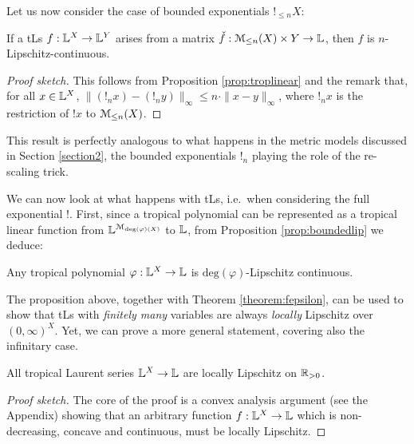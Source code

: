 Let us now consider the case of bounded exponentials $!_{\leq n}X$:
\begin{proposition}\label{prop:boundedlip}
If a tLs $f: \mathbb{L}^{X}\to \mathbb{L}^{Y}$ arises from a matrix $\check f:{\mathcal{M}_{\leq n}(X)}\times Y\to \mathbb{L}$, then $f$ is $n$-Lipschitz-continuous.
\end{proposition}
\begin{proof}[Proof sketch]
This follows from Proposition \ref{prop:troplinear} and the remark that, for all $x\in \mathbb{L}^{X}$, $\| (!_{n} x)-(!_{n} y)\|_{\infty}\leq n\cdot \| x- y\|_{\infty}$, where $!_{n} x$ is the restriction of $! x$ to $\mathcal{M}_{\leq n}(X)$.%
\end{proof}
This result is perfectly analogous to what happens in the metric models discussed in Section \ref{section2}, the bounded exponentials $!_{n}$ playing the role of the re-scaling trick.

We can now look at what happens with tLs, i.e.~when considering the full exponential $!$.
First, since a tropical polynomial can be represented as a tropical linear function from $\mathbb{L}^{\mathcal{M}_{\mathrm{deg}(\varphi)(X)}}$ to $\mathbb{L}$, from Proposition \ref{prop:boundedlip} we deduce:
\begin{proposition}\label{prop:polylip}
Any tropical polynomial $\varphi:\mathbb{L}^{X}\to\mathbb{L}$ is $\mathrm{deg}(\varphi)$-Lipschitz continuous.
\end{proposition}

The proposition above, together with Theorem \ref{theorem:fepsilon}, can be used to show that tLs with \emph{finitely many} variables are always \emph{locally} Lipschitz over $(0,\infty)^{X}$. Yet, we can prove a more general statement, covering also the infinitary case.


\begin{theorem}\label{thmTLSlocLip}
 All tropical Laurent series $\mathbb{L}^X\to\mathbb{L}$ are locally Lipschitz on $\mathbb{R}_{>0}$.
\end{theorem}
\begin{proof}[Proof sketch]
The core of the proof is a convex analysis argument (see the Appendix) showing that an arbitrary function $f:\mathbb{L}^X\to\mathbb{L}$ which is non-decreasing, concave and continuous, must be locally Lipschitz. 
\end{proof}


